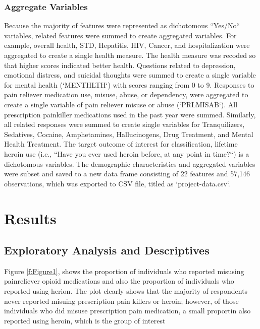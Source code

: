 \documentclass[sigconf]{acmart}
\begin{document}
\subsubsection{Aggregate Variables}
Because the majority of features were represented as dichotomous ``Yes/No`` 
variables, related features were summed to create aggregated variables. For 
example, overall health, STD, Hepatitis, HIV, Cancer, and hospitalization were 
aggregated to create a single health measure. The health measure was recoded
so that higher scores indicated better health. Questions related to depression, 
emotional distress, and suicidal thoughts were summed to create a single 
variable for mental health (`MENTHLTH`) with scores ranging from 0 to 9. 
Responses to pain reliever medication use, misuse, abuse, or dependency, 
were aggregated to create a single variable of pain reliever misuse or abuse
(`PRLMISAB`). All prescription painkiller medications used in the past year
were summed. Similarly, all related responses were summed to create single 
variables for Tranquilizers, Sedatives, Cocaine, Amphetamines, Hallucinogens, 
Drug Treatment, and Mental Health Treatment. The target outcome of interest for 
classification, lifetime heroin use (i.e., ``Have you ever used heroin before, 
at any point in time?``) is a dichotomous variables. The demographic 
characteristics and aggregated variables were subset and saved to a new data 
frame consisting of 22 features and 57,146 observations, which was exported 
to CSV file, titled as `project-data.csv`. 


\section{Results}

\subsection{Exploratory Analysis and Descriptives}\cite{mckinney17}

Figure \ref{f:Figure1}, shows the proportion of individuals who reported
misusing painreliever opioid medications and also the proportion of individuals 
who reported using herion. The plot clearly shows that the majority of 
respondents never reported misuing prescription pain killers or heroin; 
however, of those individuals who did misuse prescription pain medication, 
a small proportin also reported using heroin, which is the group of interest 
\end{document}

